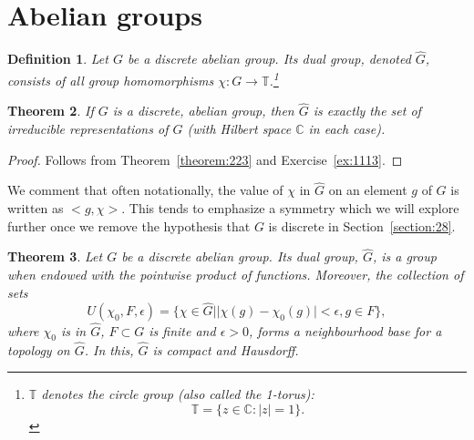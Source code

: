 \documentclass{book}
\newtheorem{definition}{Definition}[section]
\newtheorem{theorem}[definition]{Theorem}
\begin{document}
\section{Abelian groups}
\begin{definition}
  Let \(G\) be a discrete abelian group. Its \textnormal{dual group}, denoted
  \(\hat{G}\), consists of all group homomorphisms \(\chi: G \rightarrow \mathbb{T}\).\footnote{\(\mathbb{T}\)
  denotes the circle group (also called the 1-torus):
  \[\mathbb{T}=\{z\in\mathbb{C}:|z|=1\}.\]}
\end{definition}
\begin{theorem}
  If \(G\) is a discrete, abelian group, then \(\hat{G}\) is exactly the set
  of irreducible representations of \(G\) (with Hilbert space \(\mathbb{C}\) in each case).
\end{theorem}
\begin{proof}
  Follows from Theorem~\ref{theorem:223} and Exercise~\ref{ex:1113}.
\end{proof}
We comment that often notationally, the value of \(\chi\) in \(\hat{G}\) on an element
\(g\) of \(G\) is written as \(< g,\chi >\). This tends to emphasize a symmetry which
we will explore further once we remove the hypothesis that \(G\) is discrete in
Section~\ref{section:28}.
\begin{theorem}
  Let \(G\) be a discrete abelian group. Its dual group, \(\hat{G}\), is a
  group when endowed with the pointwise product of functions. Moreover, the
  collection of sets
  \[U(\chi_0,F, \epsilon) = \{\chi \in \hat{G} | |\chi(g)-\chi_0(g)| < \epsilon,g \in F\},\]
  where \(\chi_0\) is in \(\hat{G}\), \(F \subset G\) is finite and \(\epsilon > 0\), forms a neighbourhood base for
  a topology on \(\hat{G}\). In this, \(\hat{G}\) is compact and Hausdorff.
\end{theorem}
\end{document}
